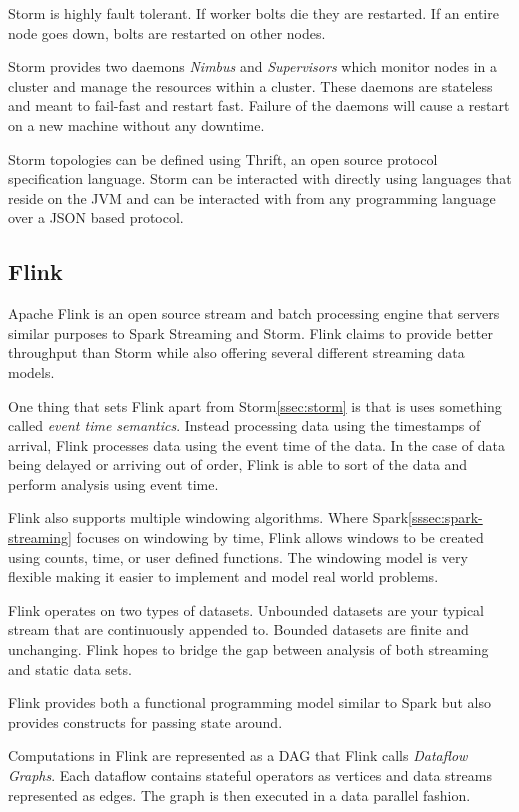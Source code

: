 \documentclass[]{article}
\begin{document}
Storm is highly fault tolerant. If worker bolts die they are restarted. If an entire node goes down, bolts are restarted on other nodes. 

Storm provides two daemons \textit{Nimbus} and \textit{Supervisors} which monitor nodes in a cluster and manage the resources within a cluster. These daemons are stateless and meant to fail-fast and restart fast. Failure of the daemons will cause a restart on a new machine without any downtime.

Storm topologies can be defined using Thrift, an open source protocol specification language. Storm can be interacted with directly using languages that reside on the JVM and can be interacted with from any programming language over a JSON based protocol.

\subsection{Flink}\label{ssec:flink}
Apache Flink\cite{carbone2015apache} is an open source stream and batch processing engine that servers similar purposes to Spark Streaming and Storm. Flink claims to provide better throughput than Storm while also offering several different streaming data models.

One thing that sets Flink apart from Storm\ref{ssec:storm} is that is uses something called \textit{event time semantics}. Instead processing data using the timestamps of arrival, Flink processes data using the event time of the data. In the case of data being delayed or arriving out of order, Flink is able to sort of the data and perform analysis using event time.

Flink also supports multiple windowing algorithms. Where Spark\ref{sssec:spark-streaming} focuses on windowing by time, Flink allows windows to be created using counts, time, or user defined functions. The windowing model is very flexible making it easier to implement and model real world problems.

Flink operates on two types of datasets. Unbounded datasets are your typical stream that are continuously appended to. Bounded datasets are finite and unchanging. Flink hopes to bridge the gap between analysis of both streaming and static data sets.

Flink provides both a functional programming model similar to Spark but also provides constructs for passing state around. 

Computations in Flink are represented as a DAG that Flink calls \textit{Dataflow Graphs}. Each dataflow contains stateful operators as vertices and data streams represented as edges. The graph is then executed in a data parallel fashion. 
\end{document}
